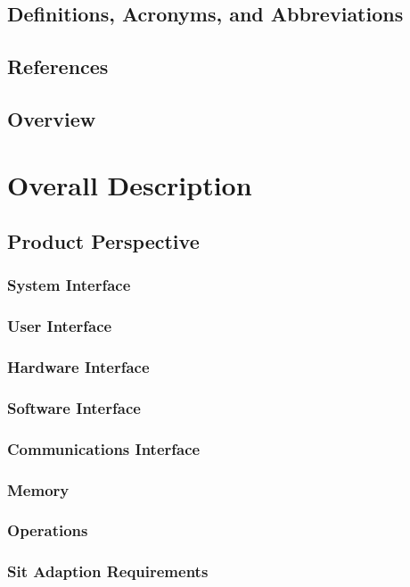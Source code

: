 \documentclass{article}
\begin{document}
        \subsection{Definitions, Acronyms, and Abbreviations}
        \subsection{References}
        \subsection{Overview}
	
	\section{Overall Description}
		
        \subsection{Product Perspective}
        
        	\subsubsection{System Interface}
            \subsubsection{User Interface}            
            \subsubsection{Hardware Interface}
            \subsubsection{Software Interface}
            \subsubsection{Communications Interface}
            \subsubsection{Memory}
            \subsubsection{Operations}
            \subsubsection{Sit Adaption Requirements}
        
\end{document}

